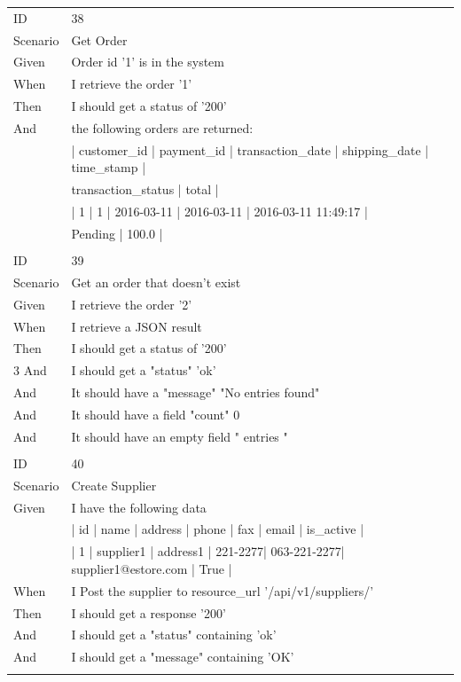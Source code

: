 \documentclass{report}
\begin{document}
\begin{tabular}{ l l }
ID 			& 38\\
Scenario		& Get Order \\
Given 		& Order id '1' is in the system \\
When 		& I retrieve the order '1' \\
Then 		& I should get a status of '200' \\
And 			& the following orders are returned: \\
    			& | customer\_id | payment\_id | transaction\_date | shipping\_date | time\_stamp          | \\ 
    			& transaction\_status | total | \\
    			& | 1           | 1          | 2016-03-11       | 2016-03-11    | 2016-03-11 11:49:17 | \\ 
    			& Pending            | 100.0 | \\ \\
ID 			& 39\\
Scenario		& Get an order that doesn't exist \\
Given 		& I retrieve the order '2' \\
When 		& I retrieve a  JSON result \\
Then 		& I should get a status of '200' \\3
And 			& I should get a "status" 'ok' \\
And 			& It should  have a "message" "No entries found" \\
And 			& It should  have a field "count" 0 \\
And 			& It should  have an empty field " entries " \\ \\
ID 			& 40\\
Scenario		& Create Supplier \\
Given 		& I have the following data \\
      		& | id | name        | address  | phone   | fax         | email                | is\_active | \\
      		& | 1  | supplier1   | address1 | 221-2277| 063-221-2277| supplier1@estore.com | True      | \\
When 		& I Post the supplier to resource\_url  '/api/v1/suppliers/' \\
Then 		& I should get a response '200' \\
And 			& I should get a "status" containing 'ok' \\
And 			& I should get a "message" containing 'OK' \\ \\

\end{tabular}
\end{document}
